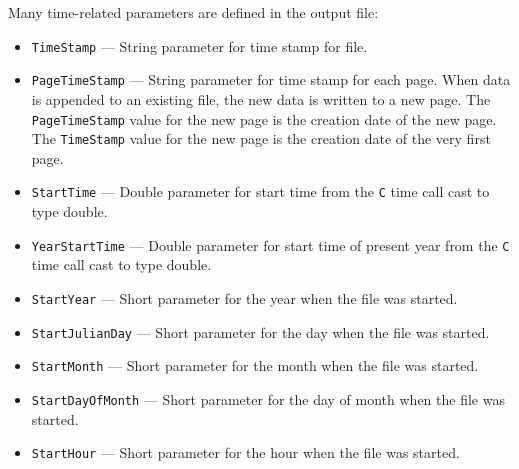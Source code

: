 \begin{itemize}
\begin{itemize}
Many time-related parameters are defined in the output file:
\begin{itemize}
        \item {\tt TimeStamp} --- String parameter for time stamp for file.
        \item {\tt PageTimeStamp} --- String parameter for time stamp for each page. When data
                is appended to an existing file, the new data is written to a new
                page. The {\tt PageTimeStamp} value for the new page is the creation
                date of the new page. The {\tt TimeStamp} value for the new page is the creation 
                date of the very first page.
        \item {\tt StartTime} --- Double parameter for start time from the {\tt C} time call cast to type double.
        \item {\tt YearStartTime} --- Double parameter for start time of present year from the {\tt C} time call cast to type double.
        \item {\verb+StartYear+} --- Short parameter for the year when the file was started.
        \item {\verb+StartJulianDay+} --- Short parameter for the day when the file was started.
        \item {\verb+StartMonth+} --- Short parameter for the month when the file was started.
        \item {\verb+StartDayOfMonth+} --- Short parameter for the day of month when the file was started.
        \item {\verb+StartHour+} --- Short parameter for the hour when the file was started.
\end{itemize}
\end{itemize}


\end{itemize}
